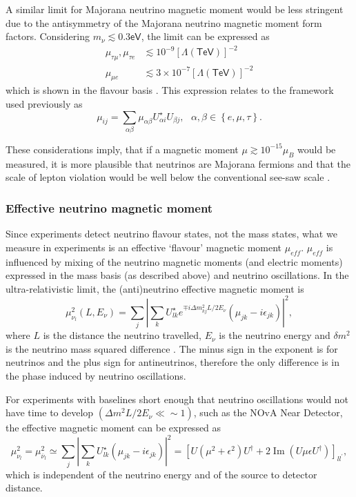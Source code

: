 A similar limit for Majorana neutrino magnetic moment would be less stringent due to the antisymmetry of the Majorana neutrino magnetic moment form factors. Considering $m_{\nu}\lesssim 0.3\textsf{eV}$, the limit can be expressed as 
\begin{align}
\mu_{\tau\mu},\mu_{\tau e} &\lesssim 10^{-9}\left[\Lambda\left(\textsf{TeV}\right)\right]^{-2}\\
\mu_{\mu e} &\lesssim 3\times 10^{-7}\left[\Lambda\left(\textsf{TeV}\right)\right]^{-2}
\end{align}
which is shown in the flavour basis \cite{nuMMMajoranaBounds2006.pdf}. This expression relates to the framework used previously as
\begin{equation}
\mu_{ij}=\sum_{\alpha\beta}\mu_{\alpha\beta}U^{\star}_{\alpha i}U_{\beta j},\ \ \ \alpha,\beta\in\left\lbrace e,\mu,\tau\right\rbrace.
\end{equation}

These considerations imply, that if a magnetic moment $\mu\gtrsim 10^{-15}\mu_B$ would be measured, it is more plausible that neutrinos are Majorana fermions and that the scale of lepton violation would be well below the conventional see-saw scale \cite{nuMMMajoranaBounds2006.pdf} .

\subsubsection{Effective neutrino magnetic moment}
Since experiments detect neutrino flavour states, not the mass states, what we measure in experiments is an effective `flavour' magnetic moment $\mu_{eff}$. $\mu_{eff}$ is influenced by mixing of the neutrino magnetic moments (and electric moments) expressed in the mass basis (as described above) and neutrino oscillations. In the ultra-relativistic limit, the (anti)neutrino effective magnetic moment is
\begin{equation}
\mu_{\nu_l}^2\left(L,E_{\nu}\right)=\sum_j\left|\sum_k U^{\star}_{lk}e^{\mp i\Delta m^2_{kj}L/2E_{\nu}}\left(\mu_{jk}-i\epsilon_{jk}\right)\right|^2,
\end{equation}
where $L$ is the distance the neutrino travelled, $E_\nu$ is the neutrino energy and $\delta m^2$ is the neutrino mass squared difference \cite{nuElmagInt2015.pdf}. The minus sign in the exponent is for neutrinos and the plus sign for antineutrinos, therefore the only difference is in the phase induced by neutrino oscillations.

For experiments with baselines short enough that neutrino oscillations would not have time to develop $\left(\Delta m^2L/2E_{\nu}\ll\sim1\right)$, such as the NOvA Near Detector, the effective magnetic moment can be expressed as
\begin{equation}
\mu_{\nu_l}^2=\mu_{\overline{\nu}_l}^2\simeq\sum_j\left|\sum_k U_{lk}^{\star}\left(\mu_{jk}-i\epsilon_{jk}\right)\right|^2=\left[U\left(\mu^2+\epsilon^2\right)U^{\dagger}+2\operatorname{Im}\left(U\mu\epsilon U^{\dagger}\right)\right]_{ll^{\prime}},
\end{equation}
which is independent of the neutrino energy and of the source to detector distance.

